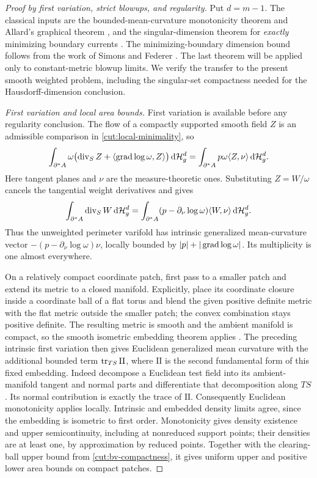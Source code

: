 \begin{proof}[Proof by first variation, strict blowups, and regularity]
Put $d=m-1$.  The classical inputs are the bounded-mean-curvature
monotonicity theorem and Allard's graphical theorem
\citep[Chapter~4, Theorem~3.17; Chapter~5, hypotheses~5.1 and
Theorem~5.2]{simonGMT}, and the singular-dimension theorem for
\emph{exactly} minimizing boundary currents
\citep[Chapter~7, Theorem~5.8]{simonGMT}.  The minimizing-boundary dimension bound follows from the work of
Simons and Federer \citep{simons1968,federer1970}. The last theorem will be applied
only to constant-metric blowup limits.  We verify the transfer to the
present smooth weighted problem, including the singular-set compactness
needed for the Hausdorff-dimension conclusion.

\emph{First variation and local area bounds.}
First variation is available before any regularity conclusion.  The
flow of a compactly supported smooth field $Z$ is an admissible
comparison in \eqref{cut:local-minimality}, so
\[
 \int_{\partial^*A}\omega
   \bigl(\operatorname{div}_S Z+\langle\operatorname{grad}\log\omega,Z\rangle\bigr)
       \,\mathrm d\mathcal H_g^d
 =\int_{\partial^*A}p\omega\langle Z,\nu\rangle
       \,\mathrm d\mathcal H_g^d.
\]
Here tangent planes and $\nu$ are the measure-theoretic ones.  Substituting
$Z=W/\omega$ cancels the tangential weight derivatives and gives
\[
 \int_{\partial^*A}\operatorname{div}_S W\,\mathrm d\mathcal H_g^d
  =\int_{\partial^*A}
       (p-\partial_\nu\log\omega)\langle W,\nu\rangle
          \,\mathrm d\mathcal H_g^d.
\]
Thus the unweighted perimeter varifold has intrinsic generalized
mean-curvature vector
$-(p-\partial_\nu\log\omega)\nu$, locally bounded by
$|p|+|\operatorname{grad}\log\omega|$.  Its multiplicity is one almost everywhere.

On a relatively compact coordinate patch, first pass to a smaller
patch and extend its metric to a closed manifold.  Explicitly, place
its coordinate closure inside a coordinate ball of a flat torus and
blend the given positive definite metric with the flat metric outside
the smaller patch; the convex combination stays positive definite.
The resulting metric is smooth and the ambient manifold is compact,
so the smooth isometric embedding theorem applies
\citep[Theorem~2]{nash1956}.  The preceding intrinsic first variation then gives
Euclidean generalized mean curvature with the additional bounded term
$\operatorname{tr}_{TS}\mathrm{II}$, where $\mathrm{II}$ is the second fundamental
form of this fixed embedding.  Indeed decompose a Euclidean test field
into its ambient-manifold tangent and normal parts and differentiate
that decomposition along $TS$.  Its normal contribution is exactly the
trace of $\mathrm{II}$.  Consequently Euclidean monotonicity applies
locally.  Intrinsic and embedded density limits agree, since the
embedding is isometric to first order.  Monotonicity gives density
existence and upper semicontinuity, including at nonreduced support
points; their densities are at least one, by approximation by reduced
points.  Together with the clearing-ball upper bound from
\cref{cut:bv-compactness}, it gives uniform upper and positive lower
area bounds on compact patches.


\end{proof}
